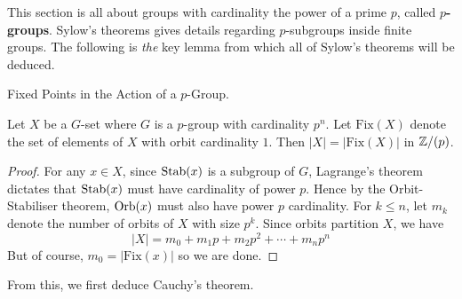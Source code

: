 \documentclass[../../book.tex]{subfiles}
\begin{document}
This section is all about 
groups with cardinality the power of a prime $p$, called \textbf{$p$-groups}. 
Sylow's theorems gives details regarding $p$-subgroups inside finite groups.
The following is \emph{the} key lemma
from which all of Sylow's theorems will be deduced. 

\begin{lem} Fixed Points in the Action of a $p$-Group. 
    
    Let $X$ be a $G$-set where $G$ is a $p$-group with cardinality $p^n$.
    Let $\mathrm{Fix}(X)$ denote the set of elements of 
    $X$ with orbit cardinality $1$. 
    Then $|X| = |\mathrm{Fix}(X)|$ in $\mathbb{Z} / (p)$. 
    
\end{lem}
\begin{proof}
    
    For any $x \in X$, since $\mathrm{Stab}(x)$ is a subgroup of $G$, 
    Lagrange's theorem dictates that $\mathrm{Stab}(x)$ must have cardinality of power $p$.
    Hence by the Orbit-Stabiliser theorem, 
    $\mathrm{Orb}(x)$ must also have power $p$ cardinality. 
    For $k \leq n$, let $m_k$ denote the number of orbits of $X$ with size $p^k$. 
    Since orbits partition $X$, we have \[
        |X| = m_0 + m_1 p + m_2 p^2 + \cdots + m_n p^n
    \]
    But of course, $m_0 = |\mathrm{Fix}(x)|$ so we are done. 
\end{proof}

From this, we first deduce Cauchy's theorem.
\end{document}
